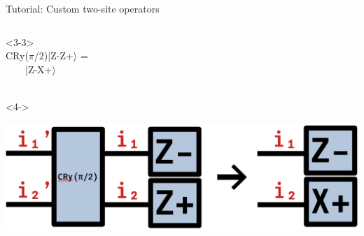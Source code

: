\begin{frame}[fragile]{Tutorial: Custom two-site operators}
\begin{columns}
\begin{column}{4.5cm}

\begin{onlyenv}<3-3>
~\\
CRy($\pi$/2)|Z-Z+$\rangle$ =\\
\ \ \ \ |Z-X+$\rangle$ \\
~\\
\end{onlyenv}

\begin{onlyenv}<4->
\vspace*{0.0cm}
\begin{center}
\includegraphics[width=1.0\textwidth]{
  slides/assets/CRyZm1Zp2_to_Zm1Xp2.png
}
\end{center}
\vspace*{0.0cm}
\end{onlyenv}

\end{column}

\end{columns}

\end{frame}
